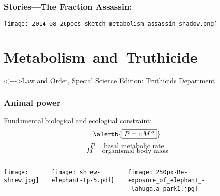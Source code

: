 
\begin{frame}
  \frametitle{Stories---The Fraction Assassin:}

  \texttt{[image: 2014-08-26pocs-sketch-metabolism-assassin\_shadow.png]}
\end{frame}


\section{Metabolism\ and\ Truthicide}


\begin{frame}
  
  \begin{block}<+->{Law and Order, Special Science Edition: Truthicide Department}
  \end{block}

\end{frame}

\begin{frame}
  \frametitle{Animal power}

  \begin{block}{Fundamental biological and ecological constraint:}
    $$
    \alertb{\boxed{P = c\, M^{\, \alpha}}}
    $$
    $$P = \mbox{basal metabolic rate}$$
    $$M = \mbox{organismal body mass}$$

    \begin{columns}
      \texttt{[image: shrew.jpg]}
      \begin{overprint}
        \texttt{[image: shrew-elephant-tp-5.pdf]}
      \end{overprint}
      \texttt{[image: 250px-Re-exposure\_of\_elephant\_-\_lahugala\_park1.jpg]}
    \end{columns}
  \end{block}

\end{frame}

